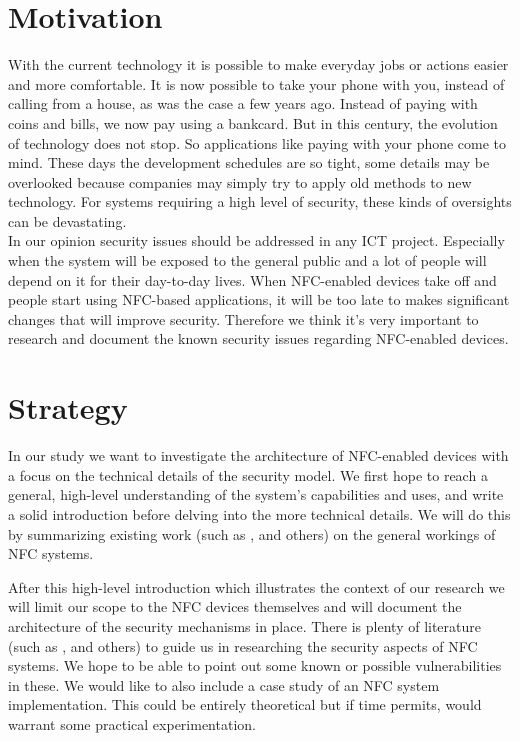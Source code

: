 \documentclass[11pt]{article} %
\begin{document}
\section{Motivation}

With the current technology it is possible to make everyday jobs or actions easier and more comfortable.
It is now possible to take your phone with you, instead of calling from a house, as was the case a few years ago.
Instead of paying with coins and bills, we now pay using a bankcard.
But in this century, the evolution of technology does not stop. So applications like paying with your phone come to mind.
These days the development schedules are so tight, some details may be overlooked because companies may simply try to apply old methods to new technology.
For systems requiring a high level of security, these kinds of oversights can be devastating.
\\

\noindent In our opinion security issues should be addressed in any ICT project.
Especially when the system will be exposed to the general public and a lot of people will depend on it for their day-to-day lives.
When NFC-enabled devices take off and people start using NFC-based applications, it will be too late to makes significant changes that will improve security.
Therefore we think it's very important to research and document the known security issues regarding NFC-enabled devices.

\section{Strategy}
In our study we want to investigate the architecture of NFC-enabled devices with a focus on the technical details of the security model.
We first hope to reach a general, high-level understanding of the system's capabilities and uses, and write a solid introduction before delving into the more technical details.
We will do this by summarizing existing work (such as \cite{Paus2007}, \cite{1731794} and others) on the general workings of NFC systems.

After this high-level introduction which illustrates the context of our research we will limit our scope to the NFC devices themselves and will document the architecture of the security mechanisms in place.
There is plenty of literature (such as \cite{mulliner09:vulnanamms}, \cite{Kfir05pickingvirtual} and others) to guide us in researching the security aspects of NFC systems. 
We hope to be able to point out some known or possible vulnerabilities in these.
We would like to also include a case study of an NFC system implementation.
This could be entirely theoretical but if time permits, would warrant some practical experimentation.
\end{document}

